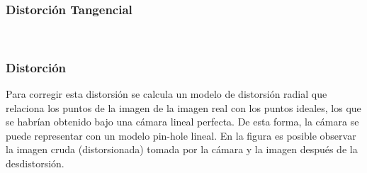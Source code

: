 \begin{frame}
    \frametitle{Distorción Tangencial}
    
    \footnotesize
    
    \begin{figure}[!h]
        \\
    \end{figure}
    
\end{frame}


\begin{frame}
	\frametitle{Distorción}
	
	Para corregir esta distorsión se calcula un modelo de distorsión radial que relaciona los puntos de la imagen de la imagen real con los puntos ideales, los que se habrían obtenido bajo una cámara lineal perfecta. De esta forma, la cámara se puede representar con un modelo pin-hole lineal. En la figura es posible observar la imagen cruda (distorsionada) tomada por la cámara y la imagen después de la desdistorsión.
	
	\begin{figure}[!h]
		\centering
	\end{figure}
	
\end{frame}


